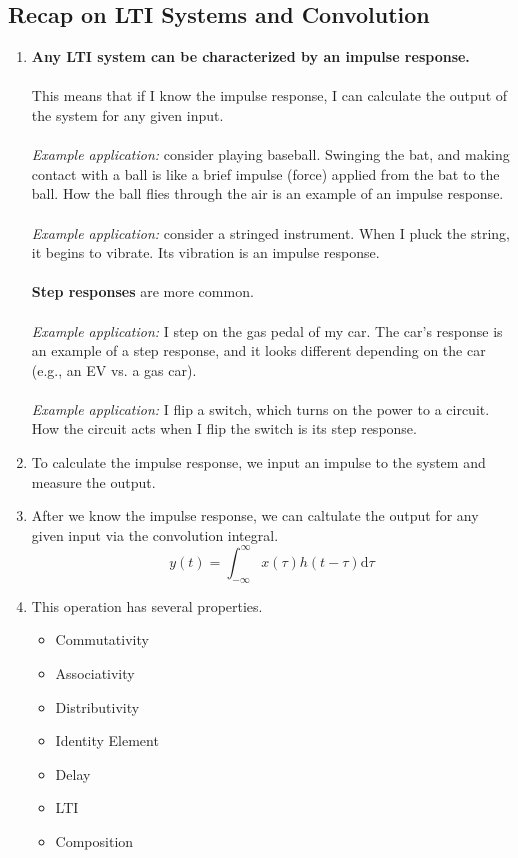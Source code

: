 \documentclass[10pt]{article}
\begin{document}
\subsection*{Recap on LTI Systems and Convolution}
\begin{enumerate}
    \item \textbf{Any LTI system can be characterized by an impulse response.}\\\\
    This means that if I know the impulse response, I can calculate the output of the system for any given input.\\\\
    \textit{Example application:} consider playing baseball.  Swinging the bat, and making contact with a ball is like a brief impulse (force) applied from the bat to the ball.  How the ball flies through the air is an example of an impulse response.\\\\
    \textit{Example application:} consider a stringed instrument.  When I pluck the string, it begins to vibrate.  Its vibration is an impulse response.\\\\
    \textbf{Step responses} are more common.\\\\
    \textit{Example application:} I step on the gas pedal of my car.  The car's response is an example of a step response, and it looks different depending on the car (e.g., an EV vs. a gas car).\\\\
    \textit{Example application:} I flip a switch, which turns on the power to a circuit.  How the circuit acts when I flip the switch is its step response.
    \item To calculate the impulse response, we input an impulse to the system and measure the output.
    \item After we know the impulse response, we can caltulate the output for any given input via the convolution integral.
    \[\boxed{y(t) = \int_{-\infty}^\infty x(\tau) h(t - \tau) \text{d}\tau}\]
    \item This operation has several properties.
    \begin{itemize}
        \item Commutativity
        \item Associativity
        \item Distributivity
        \item Identity Element
        \item Delay
        \item LTI
        \item Composition
    \end{itemize}
\end{enumerate}
\end{document}
